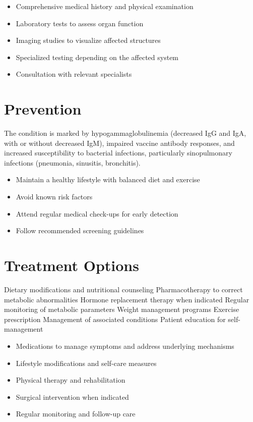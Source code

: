 \begin{itemize}[noitemsep]
  \item Comprehensive medical history and physical examination
  \item Laboratory tests to assess organ function
  \item Imaging studies to visualize affected structures
  \item Specialized testing depending on the affected system
  \item Consultation with relevant specialists
\end{itemize}
\section{Prevention}
The condition is marked by hypogammaglobulinemia (decreased IgG and IgA, with or without decreased IgM), impaired vaccine antibody responses, and increased susceptibility to bacterial infections, particularly sinopulmonary infections (pneumonia, sinusitis, bronchitis).

\begin{itemize}[noitemsep]
  \item Maintain a healthy lifestyle with balanced diet and exercise
  \item Avoid known risk factors
  \item Attend regular medical check-ups for early detection
  \item Follow recommended screening guidelines
\end{itemize}
\section{Treatment Options}
Dietary modifications and nutritional counseling Pharmacotherapy to correct metabolic abnormalities Hormone replacement therapy when indicated Regular monitoring of metabolic parameters Weight management programs Exercise prescription Management of associated conditions Patient education for self-management

\begin{itemize}[noitemsep]
  \item Medications to manage symptoms and address underlying mechanisms
  \item Lifestyle modifications and self-care measures
  \item Physical therapy and rehabilitation
  \item Surgical intervention when indicated
  \item Regular monitoring and follow-up care
\end{itemize}

